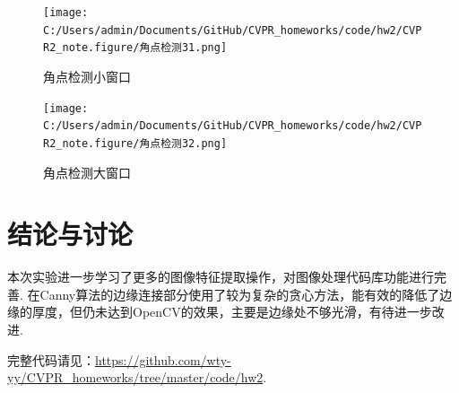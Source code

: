 \documentclass[12pt, a4paper, oneside]{ctexart}
\numberwithin{equation}{section}  %
\begin{document}
\begin{figure}[htbp]
    \centering
    \texttt{[image: C:/Users/admin/Documents/GitHub/CVPR\_homeworks/code/hw2/CVPR2\_note.figure/角点检测31.png]}
    \caption{角点检测小窗口\label{fig-10}}
\end{figure}

\begin{figure}[htbp]
    \centering
    \texttt{[image: C:/Users/admin/Documents/GitHub/CVPR\_homeworks/code/hw2/CVPR2\_note.figure/角点检测32.png]}
    \caption{角点检测大窗口\label{fig-11}}
\end{figure}
\vspace*{-1cm}
\section{结论与讨论}
本次实验进一步学习了更多的图像特征提取操作，对图像处理代码库功能进行完善. 在Canny算法的边缘连接部分使用了较为复杂的贪心方法，能有效的降低了边缘的厚度，但仍未达到OpenCV的效果，主要是边缘处不够光滑，有待进一步改进.

完整代码请见：\url{https://github.com/wty-yy/CVPR_homeworks/tree/master/code/hw2}.
\end{document}
